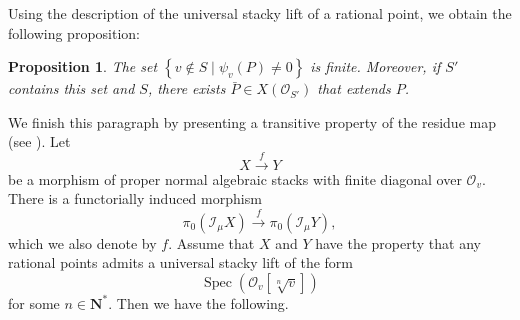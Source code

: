 \documentclass{proc-l}
\newcommand{\K}{\mathbf{K}}
\newcommand{\N}{\mathbf{N}}
\newcommand{\F}{\mathbf{F}}
\DeclareMathOperator{\Spec}{Spec}
\newcommand{\sheafI}{\mathcal{I}}
\newcommand{\sheafO}{\mathcal{O}}
\newcommand{\sector}{\pi_0(\sheafI_{\mu} X)}
\newtheorem{prop}[theorem]{Proposition}
\theoremstyle{definition}
\theoremstyle{remark}
\newtheorem{remark}[theorem]{Remark}
\newtheorem{question}[theorem]{Question}
\numberwithin{equation}{section}
\begin{document}


Using the description of the universal stacky lift of a rational point, we obtain the following proposition:

\begin{prop}
    The set $\left\{ v \not\in S \mid \psi_v(P) \neq 0 \right\}$ is finite. Moreover, if $S'$ contains this set and $S$, there exists $ \bar{P} \in X(\sheafO_{S'})  $ that extends $P$.
\end{prop}

We finish this paragraph by presenting a transitive property of the residue map (see \cite[proposition 2.20]{darda2024batyrevmanin}).  Let
$$
X \xrightarrow{f} Y
$$
be a morphism of proper normal algebraic stacks with finite diagonal over $\sheafO_v$. There is a functorially induced morphism
$$
\sector \xrightarrow{f} \pi_0(\sheafI_{\mu} Y),
$$
which we also denote by $f$. Assume that $X$ and $Y$ have the property that any rational points admits a universal stacky lift of the form
$$
\Spec(\sheafO_v[\sqrt[n]{v}])
$$
for some $n \in \N^*$. Then we have the following. 
\end{document}
